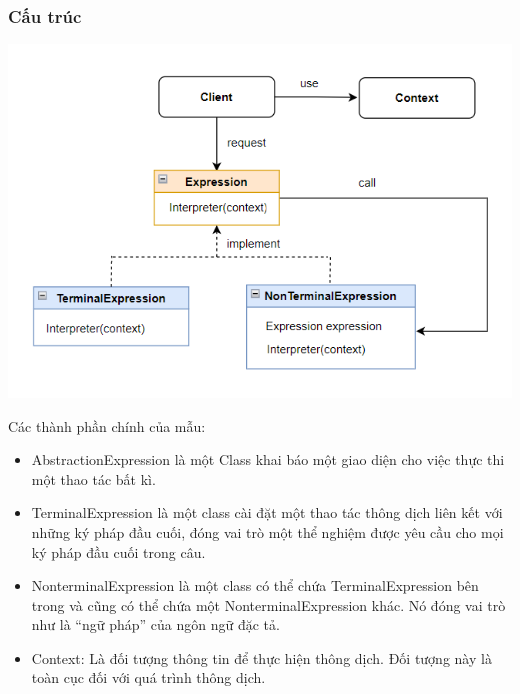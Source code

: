 \subsubsection{Cấu trúc}
\begin{center}
    \includegraphics[scale= 0.6]{image/behavioral/interpreter.png}
\end{center}
Các thành phần chính của mẫu:
\begin{itemize}
    \item AbstractionExpression là một Class khai báo một giao diện cho việc thực thi một thao tác bất kì.
    \item TerminalExpression là một class cài đặt một thao tác thông dịch liên kết với những ký pháp đầu cuối, đóng vai trò một thể nghiệm được yêu cầu cho mọi ký pháp đầu cuối trong câu.
    \item NonterminalExpression là một class có thể chứa TerminalExpression bên trong và cũng có thể chứa một NonterminalExpression khác. Nó đóng vai trò như là “ngữ pháp” của ngôn ngữ đặc tả.
    \item Context: Là đối tượng thông tin để thực hiện thông dịch. Đối tượng này là toàn cục đối với quá trình thông dịch.
\end{itemize}

